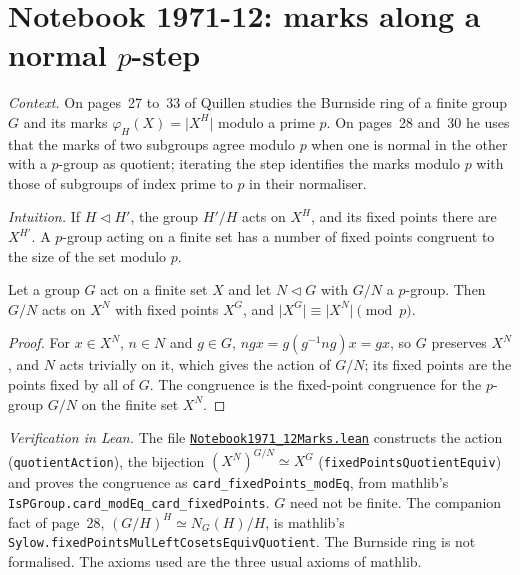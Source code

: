 \section[Notebook 1971-12: marks along a normal $p$-step]{Notebook 1971-12: marks along a normal $p$-step\protect{}}\label{sec:quillen-1971-12-marks}

\emph{Context.} On pages~27 to~33 of  Quillen studies the Burnside ring of a finite group $G$ and its marks $\varphi_H(X) = \lvert X^H\rvert$ modulo a prime $p$. On pages~28 and~30 he uses that the marks of two subgroups agree modulo $p$ when one is normal in the other with a $p$-group as quotient; iterating the step identifies the marks modulo $p$ with those of subgroups of index prime to $p$ in their normaliser.

\emph{Intuition.} If $H \lhd H'$, the group $H'/H$ acts on $X^H$, and its fixed points there are $X^{H'}$. A $p$-group acting on a finite set has a number of fixed points congruent to the size of the set modulo $p$.

\begin{encadre}
\begin{theoreme}\label{thm:quillen-1971-12-marks}
Let a group $G$ act on a finite set $X$ and let $N \lhd G$ with $G/N$ a $p$-group. Then $G/N$ acts on $X^N$ with fixed points $X^G$, and $\lvert X^G\rvert \equiv \lvert X^N\rvert \pmod p$.
\end{theoreme}
\end{encadre}

\begin{proof}
For $x \in X^N$, $n \in N$ and $g \in G$, $n g x = g (g^{-1}ng) x = gx$, so $G$ preserves $X^N$, and $N$ acts trivially on it, which gives the action of $G/N$; its fixed points are the points fixed by all of $G$. The congruence is the fixed-point congruence for the $p$-group $G/N$ on the finite set $X^N$.
\end{proof}

\emph{Verification in Lean.} The file \href{\leanblobmain/Notebook1971_12Marks.lean}{\texttt{Notebook1971\_12Marks.\allowbreak{}lean}} constructs the action (\texttt{quotientAction}), the bijection $(X^N)^{G/N} \simeq X^G$ (\texttt{fixedPointsQuotientEquiv}) and proves the congruence as \texttt{card\_fixedPoints\_modEq}, from mathlib's \texttt{IsPGroup.card\_modEq\_card\_fixedPoints}. $G$ need not be finite. The companion fact of page~28, $(G/H)^H \simeq N_G(H)/H$, is mathlib's \texttt{Sylow.fixedPointsMulLeftCosetsEquivQuotient}. The Burnside ring is not formalised. The axioms used are the three usual axioms of mathlib.

